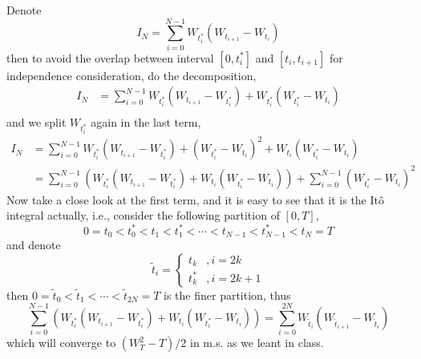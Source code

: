 \documentclass{homework}
\begin{document}
    \problem
    Denote
    \[I_N=\sum_{i=0}^{N-1}W_{t_i^*}(W_{t_{i+1}}-W_{t_i})\]
    then to avoid the overlap between interval $[0,t_i^*]$ and $[t_i,t_{i+1}]$
    for independence consideration, do the decomposition,
    \[\begin{aligned}
        I_N&=\sum_{i=0}^{N-1}W_{t_i^*}(W_{t_{i+1}}-W_{t_i^*})
        +W_{t_i^*}(W_{t_i^*}-W_{t_i})\\
    \end{aligned}\]
    and we split $W_{t_i^*}$ again in the last term,
    \[\begin{aligned}
        I_N&=\sum_{i=0}^{N-1}W_{t_i^*}(W_{t_{i+1}}-W_{t_i^*})
        +(W_{t_i^*}-W_{t_i})^2+W_{t_i}(W_{t_i^*}-W_{t_i})\\
        &=\sum_{i=0}^{N-1}\left(W_{t_i^*}(W_{t_{i+1}}-W_{t_i^*})
            +W_{t_i}(W_{t_i^*}-W_{t_i})\right)
          +\sum_{i=0}^{N-1}(W_{t_i^*}-W_{t_i})^2
    \end{aligned}\]
    Now take a close look at the first term, and it is easy to
    see that it is the It\^o  integral actually, i.e., consider
    the following partition of $[0,T]$,
    \[0=t_0<t_0^*<t_1<t_1^*<\cdots<t_{N-1}<t_{N-1}^*<t_N=T\]
    and denote 
    \[\tilde t_i=\begin{cases}
        t_k&,i=2k\\
        t_k^*&,i=2k+1
    \end{cases}\]
    then $0=\tilde t_0<\tilde t_1<\cdots<\tilde t_{2N}=T$ is the finer
    partition, thus
    \[\sum_{i=0}^{N-1}\left(W_{t_i^*}(W_{t_{i+1}}-W_{t_i^*})
            +W_{t_i}(W_{t_i^*}-W_{t_i})\right)
    =\sum_{i=0}^{2N}W_{\tilde t_i}(W_{\tilde t_{i+1}}-W_{\tilde t_i})\]
    which will converge to $(W_T^2-T)/2$ in m.s. as we leant
    in class.
\end{document}
